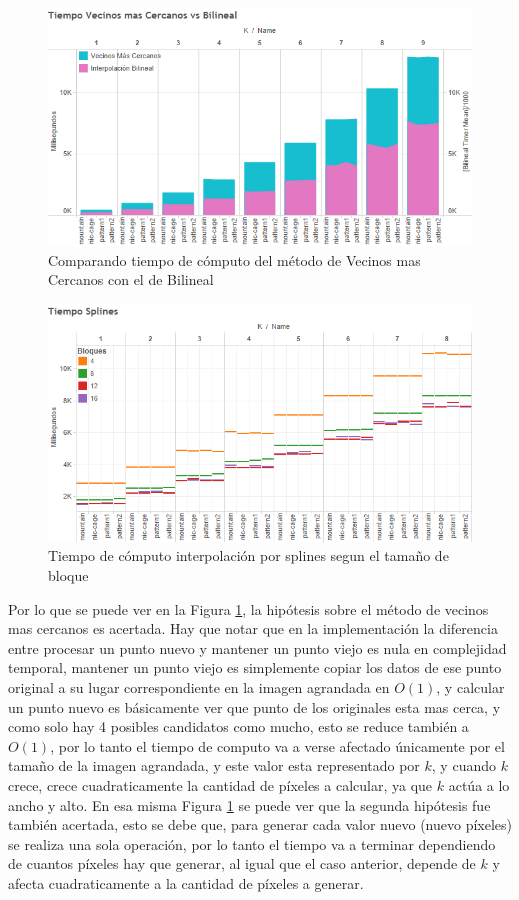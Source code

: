 \documentclass{article}
\begin{document}
\begin{figure}[H]
\centering
\includegraphics[scale=0.8]{BI-Time-knn_vs_bilineal.png}
\caption{Comparando tiempo de cómputo del método de Vecinos mas Cercanos con el de Bilineal}
\label{fig:BI-time-knn_vs_bilineal}
\end{figure}
\begin{figure}[H]
\centering
\includegraphics[scale=0.8]{BI-Time-Splines.png}
\caption{Tiempo de cómputo interpolación por splines segun el tamaño de bloque}
\label{fig:BI-time-Splines}
\end{figure}
Por lo que se puede ver en la Figura \ref{fig:BI-time-knn_vs_bilineal}, la hipótesis sobre el método de vecinos mas cercanos es acertada. Hay que notar que en la implementación la diferencia entre procesar un punto nuevo y mantener un punto viejo es nula en complejidad temporal, mantener un punto viejo es simplemente copiar los datos de ese punto original a su lugar correspondiente en la imagen agrandada en $O(1)$, y calcular un punto nuevo es básicamente ver que punto de los originales esta mas cerca, y como solo hay 4 posibles candidatos como mucho, esto se reduce también a $O(1)$, por lo tanto el tiempo de computo va a verse afectado únicamente por el tamaño de la imagen agrandada, y este valor esta representado por $k$, y cuando $k$ crece, crece cuadraticamente la cantidad de píxeles a calcular, ya que $k$ actúa a lo ancho y alto.\smallbreak
En esa misma Figura \ref{fig:BI-time-knn_vs_bilineal} se puede ver que la segunda hipótesis fue también acertada, esto se debe que, para generar cada valor nuevo (nuevo píxeles) se realiza una sola operación, por lo tanto el tiempo va a terminar dependiendo de cuantos píxeles hay que generar, al igual que el caso anterior, depende de $k$ y afecta cuadraticamente a la cantidad de píxeles a generar.\smallbreak
\end{document}

